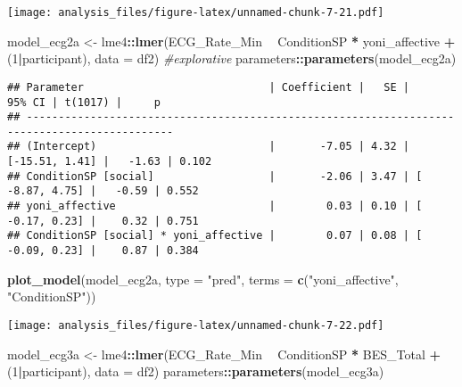 \documentclass[
]{article}
\newenvironment{Shaded}{\begin{snugshade}}{\end{snugshade}}
\newcommand{\CommentTok}[1]{\textcolor[rgb]{0.56,0.35,0.01}{\textit{#1}}}
\newcommand{\DataTypeTok}[1]{\textcolor[rgb]{0.13,0.29,0.53}{#1}}
\newcommand{\DecValTok}[1]{\textcolor[rgb]{0.00,0.00,0.81}{#1}}
\newcommand{\KeywordTok}[1]{\textcolor[rgb]{0.13,0.29,0.53}{\textbf{#1}}}
\newcommand{\NormalTok}[1]{#1}
\newcommand{\OperatorTok}[1]{\textcolor[rgb]{0.81,0.36,0.00}{\textbf{#1}}}
\newcommand{\StringTok}[1]{\textcolor[rgb]{0.31,0.60,0.02}{#1}}
\begin{document}
\texttt{[image: analysis\_files/figure-latex/unnamed-chunk-7-21.pdf]}

\begin{Shaded}
\begin{Highlighting}[]
\NormalTok{model_ecg2a <-}\StringTok{ }\NormalTok{lme4}\OperatorTok{::}\KeywordTok{lmer}\NormalTok{(ECG_Rate_Min }\OperatorTok{~}\StringTok{ }\NormalTok{ConditionSP }\OperatorTok{*}\StringTok{ }\NormalTok{yoni_affective }\OperatorTok{+}\StringTok{ }\NormalTok{(}\DecValTok{1}\OperatorTok{|}\NormalTok{participant), }\DataTypeTok{data =}\NormalTok{ df2)  }\CommentTok{#explorative}
\NormalTok{parameters}\OperatorTok{::}\KeywordTok{parameters}\NormalTok{(model_ecg2a)}
\end{Highlighting}
\end{Shaded}

\begin{verbatim}
## Parameter                             | Coefficient |   SE |         95% CI | t(1017) |     p
## ---------------------------------------------------------------------------------------------
## (Intercept)                           |       -7.05 | 4.32 | [-15.51, 1.41] |   -1.63 | 0.102
## ConditionSP [social]                  |       -2.06 | 3.47 | [ -8.87, 4.75] |   -0.59 | 0.552
## yoni_affective                        |        0.03 | 0.10 | [ -0.17, 0.23] |    0.32 | 0.751
## ConditionSP [social] * yoni_affective |        0.07 | 0.08 | [ -0.09, 0.23] |    0.87 | 0.384
\end{verbatim}

\begin{Shaded}
\begin{Highlighting}[]
\KeywordTok{plot_model}\NormalTok{(model_ecg2a, }\DataTypeTok{type =} \StringTok{"pred"}\NormalTok{, }\DataTypeTok{terms =} \KeywordTok{c}\NormalTok{(}\StringTok{"yoni_affective"}\NormalTok{, }\StringTok{"ConditionSP"}\NormalTok{))}
\end{Highlighting}
\end{Shaded}

\texttt{[image: analysis\_files/figure-latex/unnamed-chunk-7-22.pdf]}

\begin{Shaded}
\begin{Highlighting}[]
\NormalTok{model_ecg3a <-}\StringTok{ }\NormalTok{lme4}\OperatorTok{::}\KeywordTok{lmer}\NormalTok{(ECG_Rate_Min }\OperatorTok{~}\StringTok{ }\NormalTok{ConditionSP }\OperatorTok{*}\StringTok{ }\NormalTok{BES_Total }\OperatorTok{+}\StringTok{ }\NormalTok{(}\DecValTok{1}\OperatorTok{|}\NormalTok{participant), }\DataTypeTok{data =}\NormalTok{ df2)}
\NormalTok{parameters}\OperatorTok{::}\KeywordTok{parameters}\NormalTok{(model_ecg3a)}
\end{Highlighting}
\end{Shaded}
\end{document}
